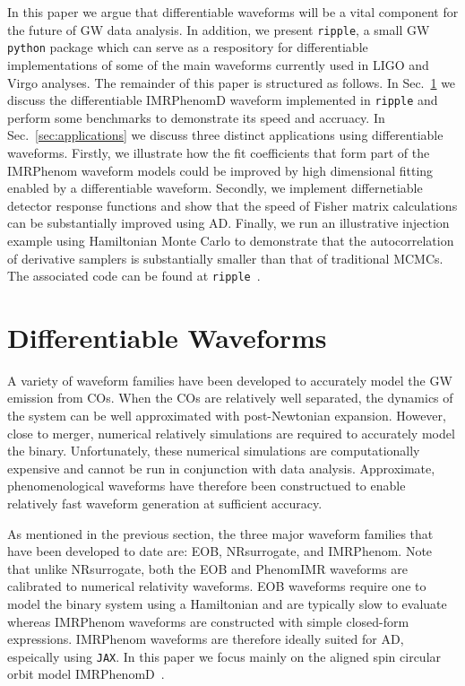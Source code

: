 \documentclass[twocolumn]{aastex631}
\newcommand{\jax}{\texttt{JAX}\xspace}
\newcommand{\ripple}{\texttt{ripple}\xspace}
\begin{document}
In this paper we argue that differentiable waveforms will be a vital component for the future of GW data analysis.
In addition, we present \ripple, a small GW \texttt{python} package which can serve as a respository for differentiable implementations of some of the main waveforms currently used in LIGO and Virgo analyses. 
The remainder of this paper is structured as follows. 
In Sec.~\ref{sec:waveforms} we discuss the differentiable IMRPhenomD waveform implemented in \ripple and perform some benchmarks to demonstrate its speed and accruacy. 
In Sec.~\ref{sec:applications} we discuss three distinct applications using differentiable waveforms. 
Firstly, we illustrate how the fit coefficients that form part of the IMRPhenom waveform models could be improved by high dimensional fitting enabled by a differentiable waveform. 
Secondly, we implement differnetiable detector response functions and show that the speed of Fisher matrix calculations can be substantially improved using AD.
Finally, we run an illustrative injection example using Hamiltonian Monte Carlo to demonstrate that the autocorrelation of derivative samplers is substantially smaller than that of traditional MCMCs.
The associated code can be found at \ripple~\citep{ripple}.

\section{Differentiable Waveforms}
\label{sec:waveforms}

A variety of waveform families have been developed to accurately model the GW emission from COs. 
When the COs are relatively well separated, the dynamics of the system can be well approximated with post-Newtonian expansion.
However, close to merger, numerical relatively simulations are required to accurately model the binary.
Unfortunately, these numerical simulations are computationally expensive and cannot be run in conjunction with data analysis.
Approximate, phenomenological waveforms have therefore been constructued to enable relatively fast waveform generation at sufficient accuracy.

As mentioned in the previous section, the three major waveform families that have been developed to date are:  EOB,  NRsurrogate, and IMRPhenom.
Note that unlike NRsurrogate, both the EOB and PhenomIMR waveforms are calibrated to numerical relativity waveforms.
EOB waveforms require one to model the binary system using a Hamiltonian and are typically slow to evaluate whereas IMRPhenom waveforms are constructed with simple closed-form expressions.
IMRPhenom waveforms are therefore ideally suited for AD, espeically using \jax. 
In this paper we focus mainly on the aligned spin circular orbit model IMRPhenomD~\citep{Husa:2015iqa, Khan:2015jqa}.
\end{document}
